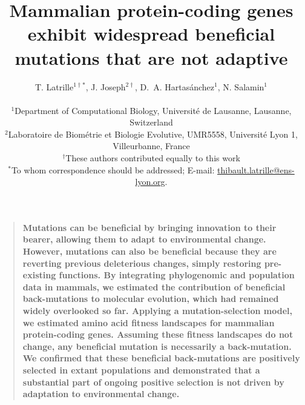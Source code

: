 \documentclass[12pt]{article}
\title{Mammalian protein-coding genes exhibit widespread beneficial mutations that are not adaptive}
\author
{T. {Latrille}$^{1\dag\ast}$, J. {Joseph}$^{2\dag}$, D.~A. {Hartasánchez}$^{1}$, N. {Salamin}$^{1}$\\
\\
\normalsize{$^{1}$Department of Computational Biology, Université de Lausanne, Lausanne, Switzerland}\\
\normalsize{$^{2}$Laboratoire de Biométrie et Biologie Evolutive, UMR5558, Université Lyon 1, Villeurbanne, France}\\
\normalsize{$^{\dag}$These authors contributed equally to this work}\\
\normalsize{$^\ast$To whom correspondence should be addressed; E-mail:  \href{mailto:thibault.latrille@ens-lyon.org}{thibault.latrille@ens-lyon.org}.}
}
\date{}
\newenvironment{sciabstract}{%
\begin{quote} \bf}
{\end{quote}}
\begin{document}

\baselineskip24pt


\maketitle


\begin{sciabstract}
    Mutations can be beneficial by bringing innovation to their bearer, allowing them to adapt to environmental change.
    However, mutations can also be beneficial because they are reverting previous deleterious changes, simply restoring pre-existing functions.
    By integrating phylogenomic and population data in mammals, we estimated the contribution of beneficial back-mutations to molecular evolution, which had remained widely overlooked so far.
    Applying a mutation-selection model, we estimated amino acid fitness landscapes for mammalian protein-coding genes.
    Assuming these fitness landscapes do not change, any beneficial mutation is necessarily a back-mutation.
    We confirmed that these beneficial back-mutations are positively selected in extant populations and demonstrated that a substantial part of ongoing positive selection is not driven by adaptation to environmental change.
\end{sciabstract}
\end{document}
